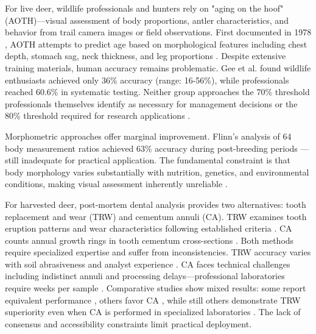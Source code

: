 \documentclass[11pt]{article}
\begin{document}
For live deer, wildlife professionals and hunters rely on "aging on the hoof" (AOTH)—visual assessment of body proportions, antler characteristics, and behavior from trail camera images or field observations. First documented in 1978 \cite{knowlton1978weight}, AOTH attempts to predict age based on morphological features including chest depth, stomach sag, neck thickness, and leg proportions \cite{kroll1996aging, demarais1999hunter, richards2003observing, hellickson2008physical}. Despite extensive training materials, human accuracy remains problematic. Gee et al. \cite{gee2013accuracy} found wildlife enthusiasts achieved only 36\% accuracy (range: 16-56\%), while professionals reached 60.6\% in systematic testing. Neither group approaches the 70\% threshold professionals themselves identify as necessary for management decisions or the 80\% threshold required for research applications \cite{gee2013accuracy}.

Morphometric approaches offer marginal improvement. Flinn's analysis of 64 body measurement ratios achieved 63\% accuracy during post-breeding periods \cite{flinn2010accuracy}—still inadequate for practical application. The fundamental constraint is that body morphology varies substantially with nutrition, genetics, and environmental conditions, making visual assessment inherently unreliable \cite{gee2013accuracy}.

For harvested deer, post-mortem dental analysis provides two alternatives: tooth replacement and wear (TRW) and cementum annuli (CA). TRW examines tooth eruption patterns and wear characteristics following established criteria \cite{severinghaus1949tooth, larson1980criteria}. CA counts annual growth rings in tooth cementum cross-sections \cite{severinghaus1949tooth, low1963age, ransom1966determining, gilbert1966aging}. Both methods require specialized expertise and suffer from inconsistencies. TRW accuracy varies with soil abrasiveness and analyst experience \cite{ludwig1967comparison, cook1979ages, hamlin2000evaluating}. CA faces technical challenges including indistinct annuli and processing delays—professional laboratories require weeks per sample \cite{nda2012estimating}. Comparative studies show mixed results: some report equivalent performance \cite{jacobson1989estimating}, others favor CA \cite{hamlin2000evaluating, cooper2013dentine}, while still others demonstrate TRW superiority even when CA is performed in specialized laboratories \cite{cook1979ages}. The lack of consensus and accessibility constraints limit practical deployment.
\end{document}
